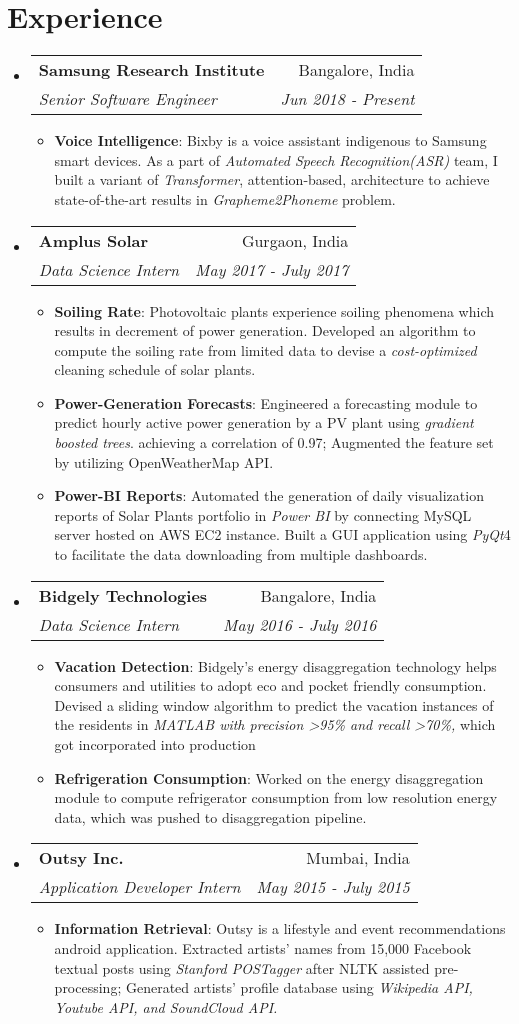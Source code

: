 \documentclass[letterpaper,11pt]{article}
\makeatletter
\newcommand{\resumeItem}[2]{
  \item\small{
    \textbf{#1}{: #2 \vspace{-3pt}}
  }
}
\newcommand{\resumeSubheading}[4]{
  \vspace{-2pt}\item
    \begin{tabular*}{0.97\textwidth}[t]{l@{\extracolsep{\fill}}r}
      \textbf{#1} & #2 \\
      \textit{\small#3} & \textit{\small #4} \\
    \end{tabular*}\vspace{-6pt}
}
\newcommand{\resumeSubHeadingListStart}{\begin{itemize}[leftmargin=*]}
\newcommand{\resumeSubHeadingListEnd}{\end{itemize}\vspace{-16pt}}
\newcommand{\resumeItemListStart}{\begin{itemize}\vspace{-4pt}}
\newcommand{\resumeItemListEnd}{\end{itemize}\vspace{-9pt}}
\makeatother
\begin{document}
\section{Experience}
  \resumeSubHeadingListStart
    \resumeSubheading
      {Samsung Research Institute}{Bangalore, India}
      {Senior Software Engineer}{Jun 2018 - Present}
      \resumeItemListStart
        \resumeItem{Voice Intelligence}
          {Bixby is a voice assistant indigenous to Samsung smart devices. As a part of \textit{Automated Speech Recognition(ASR)} team, I built a variant of \textit{Transformer}, attention-based, architecture to achieve state-of-the-art results in \textit{Grapheme2Phoneme} problem.}
      \resumeItemListEnd
    \resumeSubheading
      {Amplus Solar}{Gurgaon, India}
      {Data Science Intern}{May 2017 - July 2017}
      \resumeItemListStart
        \resumeItem{Soiling Rate}
          {Photovoltaic plants experience soiling phenomena which results in decrement of power generation. Developed an algorithm to compute the soiling rate from limited data to devise a \textit{cost-optimized} cleaning schedule of solar plants.}
        \resumeItem{Power-Generation Forecasts}
          {Engineered a forecasting module to predict hourly active power generation by a PV plant 
          using \textit{gradient boosted trees}. achieving a correlation of 0.97; Augmented the feature set by utilizing OpenWeatherMap API.}
        \resumeItem{Power-BI Reports}
          {Automated the generation of daily visualization reports of Solar Plants portfolio in \textit{Power BI} by connecting MySQL server hosted on AWS EC2 instance. Built a GUI application using \textit{PyQt}4 to facilitate the data downloading from multiple dashboards.}
      \resumeItemListEnd
    \resumeSubheading
      {Bidgely Technologies}{Bangalore, India}
      {Data Science Intern}{May 2016 - July 2016}
      \resumeItemListStart
        \resumeItem{Vacation Detection}
          {Bidgely's energy disaggregation technology helps consumers and utilities to adopt eco and pocket friendly consumption. Devised a sliding window algorithm to predict the vacation instances of the residents in \textit{MATLAB with precision \textgreater95\% and recall \textgreater70\%,} which got incorporated into production}
        \resumeItem{Refrigeration Consumption}
          {Worked on the energy disaggregation module to compute refrigerator consumption from low resolution energy data, which was pushed to disaggregation pipeline.}
      \resumeItemListEnd
    \resumeSubheading
      {Outsy Inc.}{Mumbai, India}
      {Application Developer Intern}{May 2015 - July 2015}
      \resumeItemListStart
        \resumeItem{Information Retrieval}
          {Outsy is a lifestyle and event recommendations android application. Extracted artists' names from 15,000 Facebook textual posts using \textit{Stanford POSTagger} after NLTK assisted pre-processing; Generated artists' profile database using \textit{Wikipedia API, Youtube API, and SoundCloud API.} }
      \resumeItemListEnd
  \resumeSubHeadingListEnd
\end{document}
